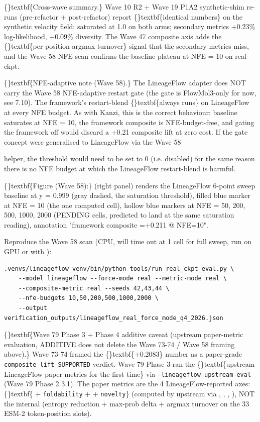 \documentclass{article}
\begin{document}
\{\}textbf\{Cross-wave summary.\} Wave 10 R2 + Wave 19 P1A2 synthetic-shim re-runs (pre-refactor + post-refactor) report \{\}textbf\{identical numbers\} on the synthetic velocity field:  saturated at 1.0 on both arms; secondary metrics +0.23\% log-likelihood, +0.09\% diversity. The Wave 47 composite axis adds the \{\}textbf\{per-position argmax turnover\} signal that the secondary metrics miss, and the Wave 58 NFE scan confirms the baseline plateau at NFE = 10 on real ckpt.

\{\}textbf\{NFE-adaptive note (Wave 58).\} The LineageFlow adapter does NOT carry the Wave 58 NFE-adaptive restart gate (the gate is FlowMol3-only for now, see 7.10). The framework's restart-blend \{\}textbf\{always runs\} on LineageFlow at every NFE budget. As with Kanzi, this is the correct behaviour: baseline saturates at NFE = 10, the framework composite is NFE-budget-free, and gating the framework off would discard a +0.21 composite lift at zero cost. If the gate concept were generalised to LineageFlow via the Wave 58

 helper, the threshold would need to be set to 0 (i.e. disabled) for the same reason  there is no NFE budget at which the LineageFlow restart-blend is harmful.

\{\}textbf\{Figure (Wave 58):\}  (right panel) renders the LineageFlow 6-point sweep  baseline at y = 0.999 (gray dashed, the saturation threshold), filled blue marker at NFE = 10 (the one computed cell), hollow blue markers at NFE = 50, 200, 500, 1000, 2000 (PENDING cells, predicted to land at the same saturation reading), annotation "framework composite =+0.211 @ NFE=10".

Reproduce the Wave 58 scan (CPU, will time out at 1 cell  for full sweep, run on GPU or with ):

\begin{verbatim}
.venvs/lineageflow_venv/bin/python tools/run_real_ckpt_eval.py \
    --model lineageflow --force-mode real --metric-mode real \
    --composite-metric real --seeds 42,43,44 \
    --nfe-budgets 10,50,200,500,1000,2000 \
    --output verification_outputs/lineageflow_real_force_mode_q4_2026.json
\end{verbatim}
\{\}textbf\{Wave 79 Phase 3 + Phase 4 additive caveat (upstream paper-metric evaluation, ADDITIVE  does not delete the Wave 73-74 / Wave 58 framing above).\} Wave 73-74 framed the \{\}textbf\{+0.2083\} number as a paper-grade \texttt{composite lift SUPPORTED} verdict. Wave 79 Phase 3 ran the \{\}textbf\{upstream LineageFlow paper metrics for the first time\} via \texttt{--lineageflow-upstream-eval} (Wave 79 Phase 2 3.1). The paper metrics are the 4 LineageFlow-reported axes: \{\}textbf\{ + \texttt{foldability} +  + \texttt{novelty}\} (computed by upstream  via , , , ), NOT the internal  (entropy reduction + max-prob delta + argmax turnover on the 33 ESM-2 token-position slots).
\end{document}
